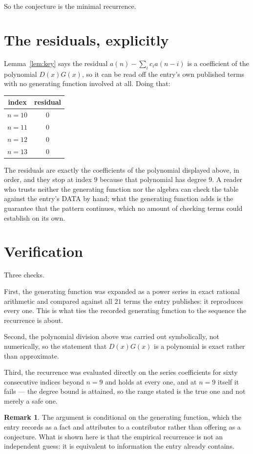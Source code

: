 \documentclass[11pt,a4paper]{article}
\theoremstyle{plain}
\theoremstyle{definition}
\newtheorem{remark}[theorem]{Remark}
\begin{document}
So the conjecture is the minimal recurrence.

\section{The residuals, explicitly}

Lemma~\ref{lem:key} says the residual $a(n)-\sum_ic_ia(n-i)$ is a coefficient of the
polynomial $D(x)G(x)$, so it can be read off the entry's own published terms with no
generating function involved at all. Doing that:
\begin{center}
\begin{tabular}{cc}
index & residual \\ \hline
$n=10$ & $0$ \\
$n=11$ & $0$ \\
$n=12$ & $0$ \\
$n=13$ & $0$
\end{tabular}
\end{center}
The residuals are exactly the coefficients of the polynomial displayed above, in order, and
they stop at index $9$ because that polynomial has degree $9$. A reader who trusts
neither the generating function nor the algebra can check the table against the entry's DATA
by hand; what the generating function adds is the guarantee that the pattern continues, which
no amount of checking terms could establish on its own.

\section{Verification}

Three checks.

First, the generating function was expanded as a power series in exact rational arithmetic and
compared against all $21$ terms the entry publishes: it reproduces every one. This is
what ties the recorded generating function to the sequence the recurrence is about.

Second, the polynomial division above was carried out symbolically, not numerically, so the
statement that $D(x)G(x)$ is a polynomial is exact rather than approximate.

Third, the recurrence was evaluated directly on the series coefficients for sixty consecutive
indices beyond $n=9$ and holds at every one, and at $n=9$ itself it fails --- the
degree bound is attained, so the range stated is the true one and not merely a safe one.

\begin{remark}
The argument is conditional on the generating function, which the entry records as a fact and
attributes to a contributor rather than offering as a conjecture. What is shown here is that
the empirical recurrence is not an independent guess: it is equivalent to information the
entry already contains.
\end{remark}
\end{document}
